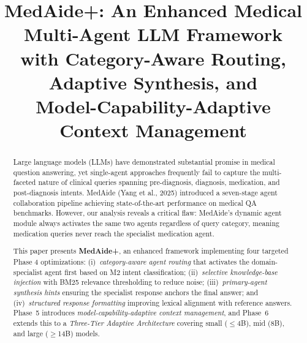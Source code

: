 \documentclass[conference]{IEEEtran}
\begin{document}
\title{MedAide+: An Enhanced Medical Multi-Agent LLM Framework\\
with Category-Aware Routing, Adaptive Synthesis, and\\Model-Capability-Adaptive Context Management}

\author{
}

\maketitle

\begin{abstract}
Large language models (LLMs) have demonstrated substantial promise in medical question answering, yet single-agent approaches frequently fail to capture the multi-faceted nature of clinical queries spanning pre-diagnosis, diagnosis, medication, and post-diagnosis intents. MedAide (Yang et al., 2025) introduced a seven-stage agent collaboration pipeline achieving state-of-the-art performance on medical QA benchmarks. However, our analysis reveals a critical flaw: MedAide's dynamic agent module always activates the same two agents regardless of query category, meaning medication queries never reach the specialist medication agent.

This paper presents \textbf{MedAide+}, an enhanced framework implementing four targeted Phase 4 optimizations: (i)~\textit{category-aware agent routing} that activates the domain-specialist agent first based on M2 intent classification; (ii)~\textit{selective knowledge-base injection} with BM25 relevance thresholding to reduce noise; (iii)~\textit{primary-agent synthesis hints} ensuring the specialist response anchors the final answer; and (iv)~\textit{structured response formatting} improving lexical alignment with reference answers. Phase~5 introduces \textit{model-capability-adaptive context management}, and Phase~6 extends this to a \textit{Three-Tier Adaptive Architecture} covering small ($\leq$4B), mid (8B), and large ($\geq$14B) models.


\end{abstract}
\end{document}
